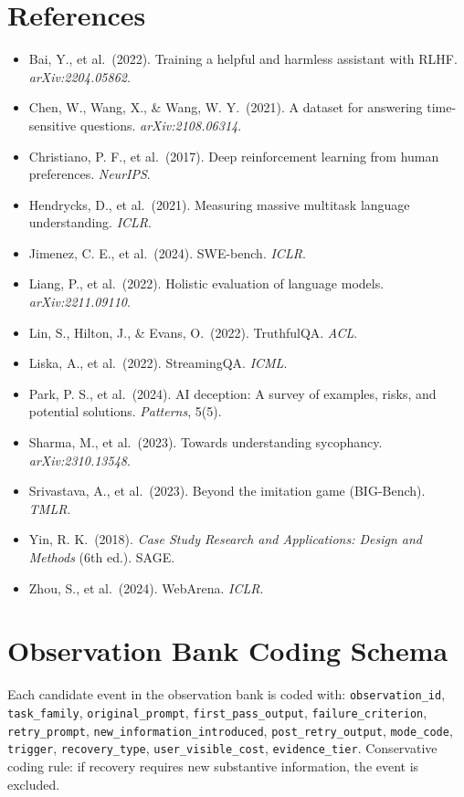 \documentclass[11pt]{article}
\begin{document}
\section*{References}
\begin{itemize}[leftmargin=*, label={}]
\item Bai, Y., et al.\ (2022). Training a helpful and harmless assistant with RLHF. \emph{arXiv:2204.05862}.
\item Chen, W., Wang, X., \& Wang, W. Y.\ (2021). A dataset for answering time-sensitive questions. \emph{arXiv:2108.06314}.
\item Christiano, P. F., et al.\ (2017). Deep reinforcement learning from human preferences. \emph{NeurIPS}.
\item Hendrycks, D., et al.\ (2021). Measuring massive multitask language understanding. \emph{ICLR}.
\item Jimenez, C. E., et al.\ (2024). SWE-bench. \emph{ICLR}.
\item Liang, P., et al.\ (2022). Holistic evaluation of language models. \emph{arXiv:2211.09110}.
\item Lin, S., Hilton, J., \& Evans, O.\ (2022). TruthfulQA. \emph{ACL}.
\item Liska, A., et al.\ (2022). StreamingQA. \emph{ICML}.
\item Park, P. S., et al.\ (2024). AI deception: A survey of examples, risks, and potential solutions. \emph{Patterns}, 5(5).
\item Sharma, M., et al.\ (2023). Towards understanding sycophancy. \emph{arXiv:2310.13548}.
\item Srivastava, A., et al.\ (2023). Beyond the imitation game (BIG-Bench). \emph{TMLR}.
\item Yin, R. K.\ (2018). \emph{Case Study Research and Applications: Design and Methods} (6th ed.). SAGE.
\item Zhou, S., et al.\ (2024). WebArena. \emph{ICLR}.
\end{itemize}

\appendix

\section{Observation Bank Coding Schema}
Each candidate event in the observation bank is coded with: \texttt{observation\_id}, \texttt{task\_family}, \texttt{original\_prompt}, \texttt{first\_pass\_output}, \texttt{failure\_criterion}, \texttt{retry\_prompt}, \texttt{new\_information\_introduced}, \texttt{post\_retry\_output}, \texttt{mode\_code}, \texttt{trigger}, \texttt{recovery\_type}, \texttt{user\_visible\_cost}, \texttt{evidence\_tier}. Conservative coding rule: if recovery requires new substantive information, the event is excluded.
\end{document}
